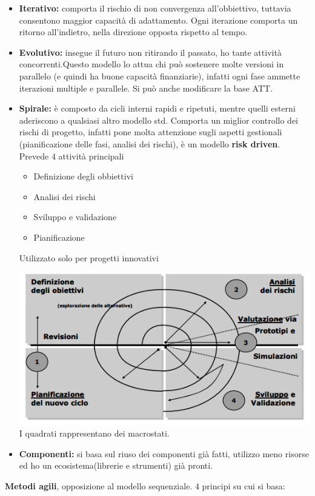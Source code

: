 \begin{itemize}
	\item \textbf{Iterativo:} comporta il rischio di non convergenza all'obbiettivo, tuttavia consentono maggior capacità di adattamento. Ogni iterazione comporta un ritorno all'indietro, nella direzione opposta rispetto al tempo.
	\item \textbf{Evolutivo:} insegue il futuro non ritirando il passato, ho tante attività concorrenti.Questo modello lo attua chi può sostenere molte versioni in parallelo (e quindi ha buone capacità finanziarie), infatti ogni fase ammette iterazioni multiple e parallele. Si può anche modificare la base ATT.
	\item\textbf{Spirale:} è composto da cicli interni rapidi e ripetuti, mentre quelli esterni aderiscono a qualsiasi altro modello std. Comporta un miglior controllo dei rischi di progetto, infatti pone molta attenzione sugli aspetti gestionali (pianificazione delle fasi, analisi dei rischi), è un modello \textbf{risk driven}. Prevede 4 attività principali 				 		\begin{itemize}
			\item Definizione degli obbiettivi
			\item Analisi dei rischi
			\item Sviluppo e validazione
			\item Pianificazione
		\end{itemize}
	Utilizzato solo per progetti innovativi
		
		\includegraphics[width=0.75\columnwidth]{img5} %
		\\
		I quadrati rappresentano dei macrostati.
		\item \textbf{Componenti:} si basa sul riuso dei componenti già fatti, utilizzo meno risorse ed ho un ecosistema(librerie e strumenti) già pronti.
\end{itemize}

\textbf{Metodi agili}, opposizione al modello sequenziale. 4 principi su cui si basa:

